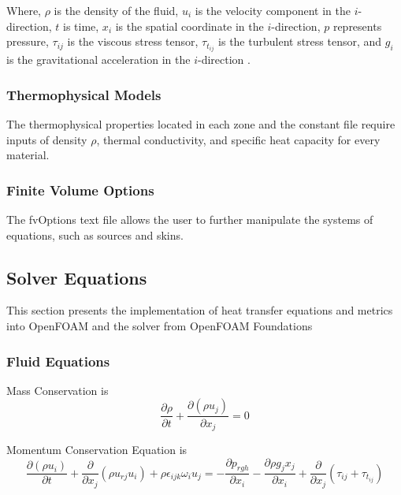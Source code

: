 Where, $\rho$ is the density of the fluid, $u_i$ is the velocity component in the $i$-direction, $t$ is time, $x_i$ is the spatial coordinate in the $i$-direction, $p$ represents pressure, $\tau_{ij}$ is the viscous stress tensor, $\tau_{t_{ij}}$ is the turbulent stress tensor, and $g_i$ is the gravitational acceleration in the $i$-direction
 \cite{cht}.


\subsubsection{Thermophysical Models}
The thermophysical properties located in each zone and the constant file require inputs of density $\rho$, thermal conductivity, and specific heat capacity for every material.
\subsubsection{Finite Volume Options}
The fvOptions text file allows the user to further manipulate the systems of equations, such as sources and skins. 

\subsection{Solver Equations}    
This section presents the implementation of heat transfer equations and metrics into OpenFOAM and the solver from OpenFOAM Foundations\cite{OpenFOAMFoundation}
\subsubsection{Fluid Equations}

      Mass Conservation is \begin{equation}
\frac{\partial \rho}{\partial t} + \frac{\partial (\rho u_j)}{\partial x_j} = 0
\end{equation}


      Momentum Conservation Equation is \begin{equation}
\frac{\partial (\rho u_i)}{\partial t} + \frac{\partial}{\partial x_j} \left( \rho u_{rj} u_i \right)  + \rho\epsilon_{ijk}\omega_i u_j = - \frac{\partial p_{rgh}}{\partial x_i} - \frac{\partial \rho g_j x_j}{\partial x_i}  + \frac{\partial}{\partial x_j} \left( \tau_{ij} + \tau_{t_{ij}} \right)
\end{equation}


